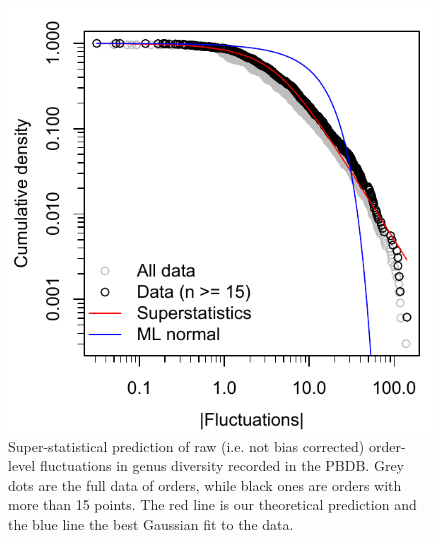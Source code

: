 \documentclass[12pt]{article}
\begin{document}
\begin{figure}[!hp]
  \centering
  \includegraphics[scale=0.7]{figs/figSupp_pbdbRaw_Px.pdf}
  \caption[Super-statistical prediction of raw data]{Super-statistical
    prediction of raw (i.e. not bias corrected) order-level
    fluctuations in genus diversity recorded in the PBDB. Grey dots
    are the full data of orders, while black ones are orders with more
    than 15 points. The red line is our theoretical prediction and the
    blue line the best Gaussian fit to the data.}
  \label{fig:supp_rawPBDB_Px}
\end{figure}
\end{document}
